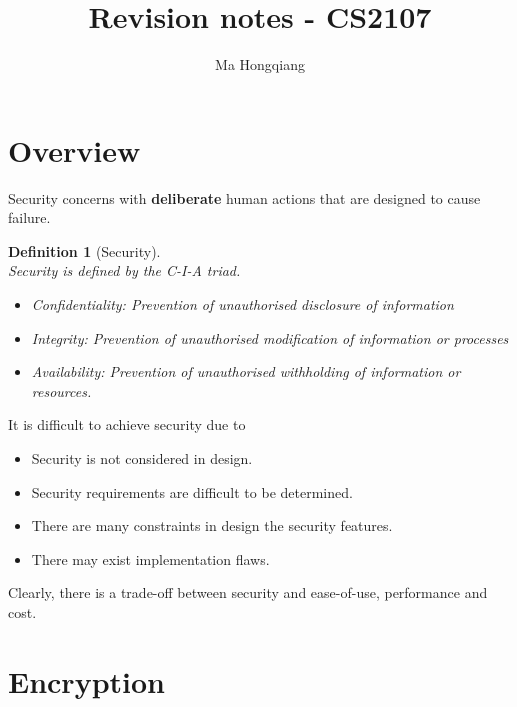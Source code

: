 \documentclass[12pt]{article}
\newtheorem{definition}{Definition}[section]
\theoremstyle{definition}
\begin{document}
\title{Revision notes - CS2107}
\author{Ma Hongqiang}
\maketitle
\tableofcontents

\clearpage
\section{Overview}
Security concerns with \textbf{deliberate} human actions that are designed to cause failure.
\begin{definition}[Security]
\hfill\\\normalfont Security is defined by the C-I-A triad.
\begin{itemize}
  \item Confidentiality: Prevention of unauthorised disclosure of information
  \item Integrity: Prevention of unauthorised modification of information or processes
  \item Availability: Prevention of unauthorised withholding of information or resources.
\end{itemize}
\end{definition}
It is difficult to achieve security due to
\begin{itemize}
  \item Security is not considered in design.
  \item Security requirements are difficult to be determined.
  \item There are many constraints in design the security features.
  \item There may exist implementation flaws.
\end{itemize}
Clearly, there is a trade-off between security and ease-of-use, performance and cost.
\clearpage
\section{Encryption}
\end{document}
